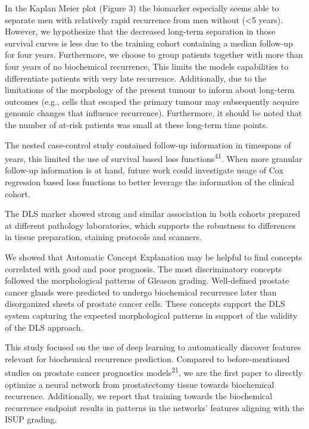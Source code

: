 \documentclass[
  12pt,
  a5,margin=2cmpaper,
]{article}
\begin{document}
In the Kaplan Meier plot (Figure 3) the biomarker especially seems able
to separate men with relatively rapid recurrence from men without
(\textless5 years). However, we hypothesize that the decreased long-term
separation in those survival curves is less due to the training cohort
containing a median follow-up for four years. Furthermore, we choose to
group patients together with more than four years of no biochemical
recurrence, This limits the model\textquotesingle s capabilities to
differentiate patients with very late recurrence. Additionally, due to
the limitations of the morphology of the present tumour to inform about
long-term outcomes (e.g., cells that escaped the primary tumour may
subsequently acquire genomic changes that influence recurrence).
Furthermore, it should be noted that the number of at-risk patients was
small at these long-term time points.

The nested case-control study contained follow-up information in
timespans of years, this limited the use of survival based loss
functions\textsuperscript{41}. When more granular follow-up information
is at hand, future work could investigate usage of Cox regression based
loss functions to better leverage the information of the clinical
cohort.

The DLS marker showed strong and similar association in both cohorts
prepared at different pathology laboratories, which supports the
robustness to differences in tissue preparation, staining protocols and
scanners.

We showed that Automatic Concept Explanation may be helpful to find
concepts correlated with good and poor prognosis. The most
discriminatory concepts followed the morphological patterns of Gleason
grading. Well-defined prostate cancer glands were predicted to undergo
biochemical recurrence later than disorganized sheets of prostate cancer
cells. These concepts support the DLS system capturing the expected
morphological patterns in support of the validity of the DLS approach.

This study focused on the use of deep learning to automatically discover
features relevant for biochemical recurrence prediction. Compared to
before-mentioned studies on prostate cancer prognostics
models\textsuperscript{21}, we are the first paper to directly optimize
a neural network from prostatectomy tissue towards biochemical
recurrence. Additionally, we report that training towards the
biochemical recurrence endpoint results in patterns in the networks'
features aligning with the ISUP grading.
\end{document}
